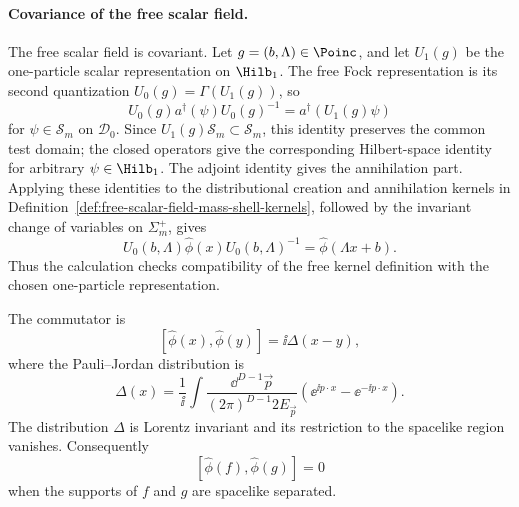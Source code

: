 \paragraph{Covariance of the free scalar field.}
The free scalar field is covariant.  Let \(g=(b,\Lambda)\in \Poinc\), and let
\(U_1(g)\) be the one-particle scalar representation on \(\Hilb_1\).  The
free Fock representation is its second quantization \(U_0(g)=\Gamma(U_1(g))\),
so
\[
  U_0(g)a^\dagger(\psi)U_0(g)^{-1}
  =
  a^\dagger(U_1(g)\psi)
\]
for \(\psi\in\mathcal S_m\) on \(\mathcal D_0\).  Since \(U_1(g)\mathcal S_m
\subset\mathcal S_m\), this identity preserves the common test domain; the
closed operators give the corresponding Hilbert-space identity for arbitrary
\(\psi\in\Hilb_1\).  The adjoint identity gives the annihilation part.
Applying these identities to the distributional creation and annihilation
kernels in Definition~\ref{def:free-scalar-field-mass-shell-kernels}, followed
by the invariant change of variables on \(\Sigma_m^+\), gives
\[
  U_0(b,\Lambda)\widehat\phi(x)U_0(b,\Lambda)^{-1}
  =
  \widehat\phi(\Lambda x+b).
\]
Thus the calculation checks compatibility of the free kernel definition with
the chosen one-particle representation.

\begin{proposition}
\label{prop:free-scalar-microcausality-chapter-two}
The commutator is
\[
  [\widehat\phi(x),\widehat\phi(y)]
  =
  \ii\Delta(x-y),
\]
where the Pauli--Jordan distribution is
\[
  \Delta(x)
  =
  \frac{1}{\ii}
  \int
  \frac{\dd^{D-1}\vec p}{(2\pi)^{D-1}2E_{\vec p}}
  \left(
    \ee^{\ii p\cdot x}-\ee^{-\ii p\cdot x}
  \right).
\]
The distribution \(\Delta\) is Lorentz invariant and its restriction to the
spacelike region vanishes. Consequently
\[
  [\widehat\phi(f),\widehat\phi(g)]=0
\]
when the supports of \(f\) and \(g\) are spacelike separated.
\end{proposition}

